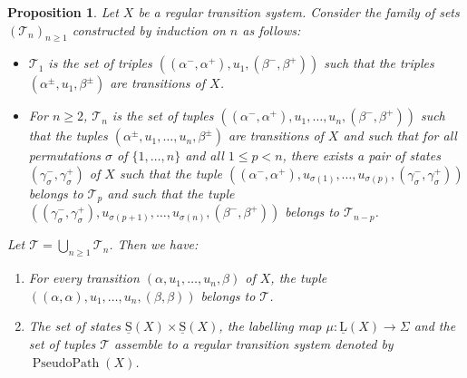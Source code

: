 \documentclass[a4paper,12pt]{amsart}
\newtheorem{prop}[thm]{Proposition}
\begin{document}
\begin{prop} \label{ps-construct} Let $X$ be a regular transition
system. Consider the family of sets $(\mathcal{T}_n)_{n{\geqslant} 1}$
constructed by induction on $n$ as follows:
\begin{itemize}
\item $\mathcal{T}_1$ is the set of triples
  $((\alpha^-,\alpha^+),u_1,(\beta^-,\beta^+))$ such that the
  triples $(\alpha^\pm,u_1,\beta^\pm)$ are transitions of $X$.
\item For $n{\geqslant} 2$, $\mathcal{T}_n$ is the set of tuples
  $((\alpha^-,\alpha^+),u_1,\dots,u_n,(\beta^-,\beta^+))$ such that
  the tuples $(\alpha^\pm,u_1,\dots,u_n,\beta^\pm)$ are transitions of
  $X$ and such that for all permutations $\sigma$ of $\{1,\dots,n\}$
  and all $1{\leqslant} p <n$, there exists a pair of states
  $(\gamma_\sigma^-,\gamma_\sigma^+)$ of $X$ such that the tuple
  $((\alpha^-,\alpha^+),u_{\sigma(1)},\dots,u_{\sigma(p)},(\gamma_\sigma^-,\gamma_\sigma^+))$
  belongs to $\mathcal{T}_p$ and such that the tuple
  $((\gamma_\sigma^-,\gamma_\sigma^+),u_{\sigma(p+1)},\dots,u_{\sigma(n)},(\beta^-,\beta^+))$
  belongs to $\mathcal{T}_{n-p}$.
\end{itemize}
Let $\mathcal{T}=\bigcup_{n{\geqslant} 1} \mathcal{T}_n$. Then we have:
\begin{enumerate}
\item[a)] For every transition $(\alpha,u_1,\dots,u_n,\beta)$ of $X$, the
  tuple $((\alpha,\alpha),u_1,\dots,u_n,(\beta,\beta))$ belongs to
  $\mathcal{T}$.
\item[b)] The set of states $\operatorname{\underline{S}}(X)\times \operatorname{\underline{S}}(X)$, the labelling map $\mu:\operatorname{\underline{L}}(X)\to
  \Sigma$ and the set of tuples $\mathcal{T}$ assemble to a regular transition
  system denoted by $\operatorname{{PseudoPath}}(X)$.
\end{enumerate} \end{prop}
\end{document}
